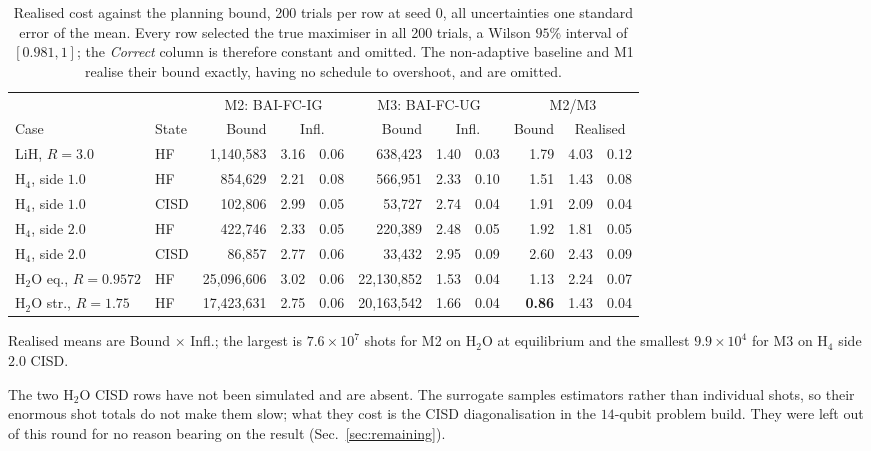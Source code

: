 \documentclass[10pt]{article}
\begin{document}
\begin{table}[!htbp]
\centering
\scriptsize
\caption{Realised cost against the planning bound, 200 trials per row at seed $0$, all uncertainties one standard error of the mean. Every row selected the true maximiser in all 200 trials, a Wilson $95\%$ interval of $[0.981,1]$; the \emph{Correct} column is therefore constant and omitted. The non-adaptive baseline and M1 realise their bound exactly, having no schedule to overshoot, and are omitted.}
\label{tab:finite-shot}
\begin{tabular}{llrr@{\,$\pm$\,}lrr@{\,$\pm$\,}lrr@{\,$\pm$\,}l}
\toprule
& & \multicolumn{3}{c}{M2: BAI-FC-IG} & \multicolumn{3}{c}{M3: BAI-FC-UG} & \multicolumn{3}{c}{M2/M3} \\
\cmidrule(lr){3-5}\cmidrule(lr){6-8}\cmidrule(lr){9-11}
Case & State & Bound & \multicolumn{2}{c}{Infl.} & Bound & \multicolumn{2}{c}{Infl.} & Bound & \multicolumn{2}{c}{Realised} \\
\midrule
LiH, $R{=}3.0$ & HF & 1,140,583 & 3.16 & 0.06 & 638,423 & 1.40 & 0.03 & 1.79 & 4.03 & 0.12 \\
H$_4$, side $1.0$ & HF & 854,629 & 2.21 & 0.08 & 566,951 & 2.33 & 0.10 & 1.51 & 1.43 & 0.08 \\
H$_4$, side $1.0$ & CISD & 102,806 & 2.99 & 0.05 & 53,727 & 2.74 & 0.04 & 1.91 & 2.09 & 0.04 \\
H$_4$, side $2.0$ & HF & 422,746 & 2.33 & 0.05 & 220,389 & 2.48 & 0.05 & 1.92 & 1.81 & 0.05 \\
H$_4$, side $2.0$ & CISD & 86,857 & 2.77 & 0.06 & 33,432 & 2.95 & 0.09 & 2.60 & 2.43 & 0.09 \\
H$_2$O eq., $R{=}0.9572$ & HF & 25,096,606 & 3.02 & 0.06 & 22,130,852 & 1.53 & 0.04 & 1.13 & 2.24 & 0.07 \\
H$_2$O str., $R{=}1.75$ & HF & 17,423,631 & 2.75 & 0.06 & 20,163,542 & 1.66 & 0.04 & \textbf{0.86} & 1.43 & 0.04 \\
\bottomrule
\end{tabular}
\end{table}

Realised means are Bound $\times$ Infl.; the largest is $7.6\times10^{7}$ shots
for M2 on H$_2$O at equilibrium and the smallest $9.9\times10^{4}$ for M3 on
H$_4$ side $2.0$ CISD.

The two H$_2$O CISD rows have not been simulated and are absent. The surrogate
samples estimators rather than individual shots, so their enormous shot totals do
not make them slow; what they cost is the CISD diagonalisation in the
$14$-qubit problem build. They were left out of this round for no reason bearing
on the result (Sec.~\ref{sec:remaining}).
\end{document}
